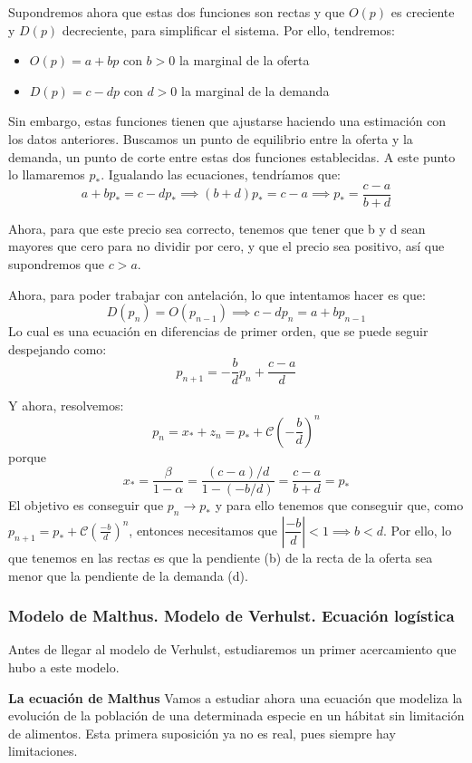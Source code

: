 \documentclass[11pt, a4paper, titlepage]{article}
\theoremstyle{theorem-style}
\theoremstyle{definition-style}
\theoremstyle{remark-style}
\theoremstyle{example-style}
\begin{document}
Supondremos ahora que estas dos funciones son rectas y que $O(p)$ es creciente y $D(p)$ decreciente, para simplificar el sistema. Por ello, tendremos:
\begin{itemize}
\item $O(p) = a+bp $ con $b>0$ la marginal de la oferta
\item $D(p) = c -dp $ con $d> 0$ la marginal de la demanda
	
\end{itemize}
Sin embargo, estas funciones tienen que ajustarse haciendo una estimación con los datos anteriores. Buscamos un punto de equilibrio entre la oferta y la demanda, un punto de corte entre estas dos funciones establecidas. A este punto lo llamaremos $p_*$. Igualando las ecuaciones, tendríamos que:
\[
 a+bp_*=c-dp_*\implies(b+d)p_*= c-a \implies p_* = \frac{c-a}{b+d}
\]

Ahora, para que este precio sea correcto, tenemos que tener que b y d sean mayores que cero para no dividir por cero, y que el precio sea positivo, así que supondremos que $c> a$.

Ahora, para poder trabajar con antelación, lo que intentamos hacer es que:
\[
D(p_n) = O(p_{n-1}) \implies c-dp_n = a+bp_{n-1}
\]
Lo cual es una ecuación en diferencias de primer orden, que se puede seguir despejando como:
\[
p_{n+1} = -\dfrac{b}{d}p_n+ \dfrac{c-a}{d}
\]

Y ahora, resolvemos:
\[
p_n = x_* + z_n = p_* + \mathcal{C}\left(-\frac{b}{d}\right)^n
\] porque 
\[
x_* = \frac{\beta}{1-\alpha} = \frac{(c-a)/d}{1-(-b/d)}= \frac{c-a}{b+d} = p_*
\]
El objetivo es conseguir que $p_n \to p_*$ y para ello tenemos que conseguir que, como $p_{n+1} =p_* + \mathcal{C}(\frac{-b}{d})^n$, entonces necesitamos que $\left|\dfrac{-b}{d}\right| < 1 \implies b < d$.
Por ello, lo que tenemos en las rectas es que la pendiente (b) de la recta de la oferta sea menor que la pendiente de la demanda (d).

\subsubsection{Modelo de Malthus. Modelo de Verhulst. Ecuación logística}

Antes de llegar al modelo de Verhulst, estudiaremos un primer acercamiento que hubo a este modelo.

\textbf{La ecuación de Malthus}
Vamos a estudiar ahora una ecuación que modeliza la evolución de la población de una determinada especie en un hábitat sin limitación de alimentos. Esta primera suposición ya no es real, pues siempre hay limitaciones.
\end{document}
